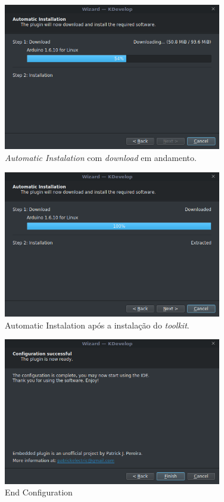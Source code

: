 \begin{figure}[!htb]
  \centering
  \includegraphics[width=0.85\textwidth]{figuras/kdevelopInstaller21.png}
  \caption[Automatic Instalation executando Download]{\textit{Automatic Instalation} com \textit{download} em andamento.}
  \label{fig:kdevelopinstaller21}
\end{figure}

\begin{figure}[!htb]
  \centering
  \includegraphics[width=0.85\textwidth]{figuras/kdevelopInstaller22.png}
  \caption[Automatic Instalation pós instalação]{Automatic Instalation após a instalação do \textit{toolkit}.}
  \label{fig:kdevelopinstaller22}
\end{figure}

\begin{figure}[!htb]
  \centering
  \includegraphics[width=0.85\textwidth]{figuras/kdevelopInstaller3.png}
  \caption[End Configuration]{End Configuration}
  \label{fig:kdevelopinstaller3}
\end{figure}

